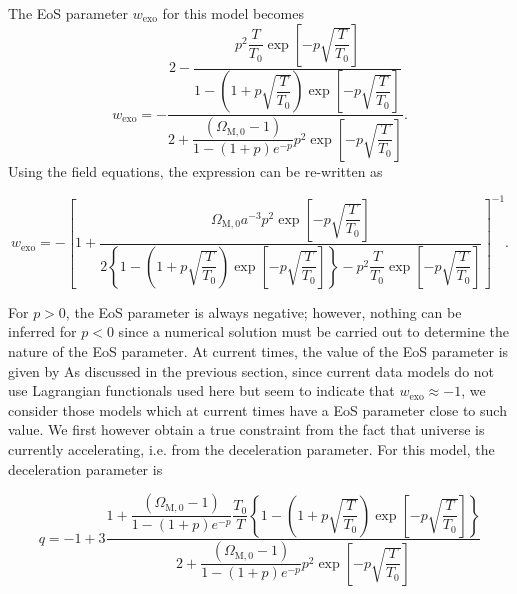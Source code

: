 \documentclass[prl,floatfix,showpacs,twocolumn,preprintnumbers,amsmath,amssymb,superscriptaddress]{revtex4}
\begin{document}
The EoS parameter $w_{\text{exo}}$ for this model becomes
\begin{equation}
w_{\text{exo}} = -\frac{2-\dfrac{p^2 \dfrac{T}{T_0}\exp \left[-p \sqrt{\dfrac{T}{T_0}}\right]}{1-\left(1+p  \sqrt{\dfrac{T}{T_0}}\right)\exp \left[-p \sqrt{\dfrac{T}{T_0}}\right]}}{2+\dfrac{\left(\Omega_{\text{M},0}-1\right)}{1-\left(1+p\right)e^{-p}}  p^2 \exp \left[-p \sqrt{\dfrac{T}{T_0}}\right]}.
\end{equation}
Using the field equations, the expression can be re-written as
\begin{widetext}

\begin{equation}
w_{\text{exo}} = -\left[1+\dfrac{\Omega_{\text{M},0} a^{-3} p^2 \exp \left[-p \sqrt{\dfrac{T}{T_0}}\right]}{2\left\lbrace 1-\left(1+p\sqrt{\dfrac{T}{T_0}}\right)\exp \left[-p \sqrt{\dfrac{T}{T_0}}\right]\right\rbrace-p^2 \dfrac{T}{T_0} \exp \left[-p \sqrt{\dfrac{T}{T_0}}\right]}\right]^{-1}.
\end{equation}

\end{widetext}
For $p > 0$, the EoS parameter is always negative; however, nothing can be inferred for $p < 0$ since a numerical solution must be carried out to determine the nature of the EoS parameter. At current times, the value of the EoS parameter is given by
As discussed in the previous section, since current data models do not use Lagrangian functionals used here but seem to indicate that $w_{\text{exo}} \approx -1$, we consider those models which at current times have a EoS parameter close to such value. We first however obtain a true constraint from the fact that universe is currently accelerating, i.e. from the deceleration parameter. For this model, the deceleration parameter is
\begin{widetext}

\begin{equation}
q = -1+3\frac{1+\dfrac{(\Omega_{\text{M},0}-1)}{1-(1+p)e^{-p}} \dfrac{T_0}{T} \left\lbrace 1-\left(1+ p \sqrt{\dfrac{T}{T_0}}\right)\exp \left[-p \sqrt{\dfrac{T}{T_0}}\right]\right\rbrace}{2+\dfrac{(\Omega_{\text{M},0}-1)}{1-(1+p)e^{-p}}  p^2 \exp \left[-p \sqrt{\dfrac{T}{T_0}}\right]}
\end{equation}

\end{widetext}
\end{document}
